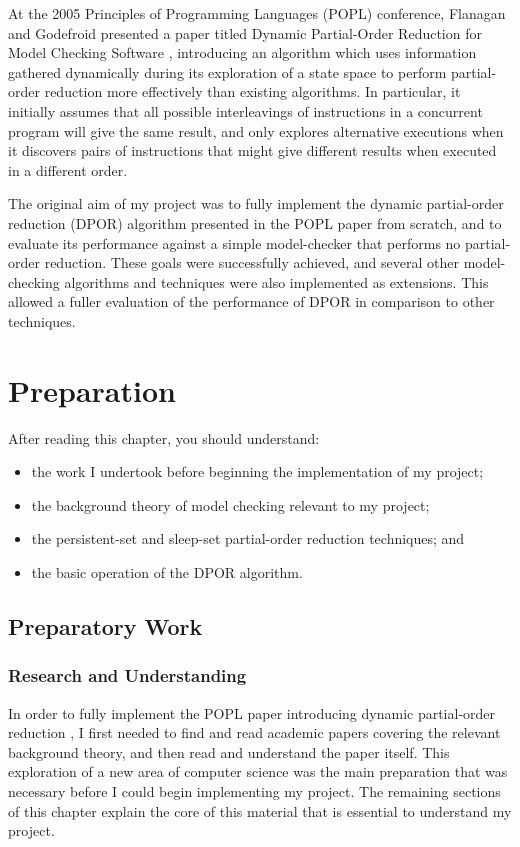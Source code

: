 \documentclass[12pt,a4paper,twoside,openany]{report}
\newenvironment{understandinglist}
	{\begin{itemize} \itemsep 0em}{\end{itemize}}
\begin{document}
At the 2005 Principles
of Programming Languages (POPL) conference,
Flanagan and Godefroid presented
a paper titled Dynamic Partial-Order Reduction
for Model Checking Software  \cite{flan05},
introducing an algorithm
which uses information gathered dynamically
during its
exploration of a state space
to perform partial-order reduction more
effectively than existing algorithms.
In particular, it initially assumes that
all possible interleavings of
instructions in a concurrent program will
give the same result, and only explores
alternative executions when it discovers
pairs of instructions that might give
different results when executed in a
different order.

The original aim of my project was to
fully implement the dynamic partial-order
reduction (DPOR) algorithm presented in the POPL
paper from scratch, and to evaluate its performance
against a simple model-checker
that performs no partial-order reduction.
These goals were successfully
achieved, and several other model-checking
algorithms and techniques were also
implemented as extensions. This allowed
a fuller evaluation of the performance
of DPOR in comparison to other techniques.

\chapter{Preparation}
\label{cha:prep}
After reading this chapter,
you should understand:
\begin{understandinglist}
	\item the work I undertook before beginning
	the implementation of my project;
	\item the background theory of model checking
	relevant to my project;
	\item the persistent-set
	and sleep-set partial-order reduction techniques; and
	\item the basic operation of the DPOR algorithm.
\end{understandinglist}

\section{Preparatory Work}

\subsection{Research and Understanding}

In order to fully implement the
POPL paper introducing dynamic partial-order
reduction \cite{flan05}, I first needed
to find and read academic papers
covering the relevant
background theory, and then
read and understand the paper itself.
This exploration
of a new area of computer science was the
main preparation that was necessary
before I could begin implementing
my project. The remaining sections
of this chapter explain the core
of this material that is essential
to understand my project.
\end{document}
